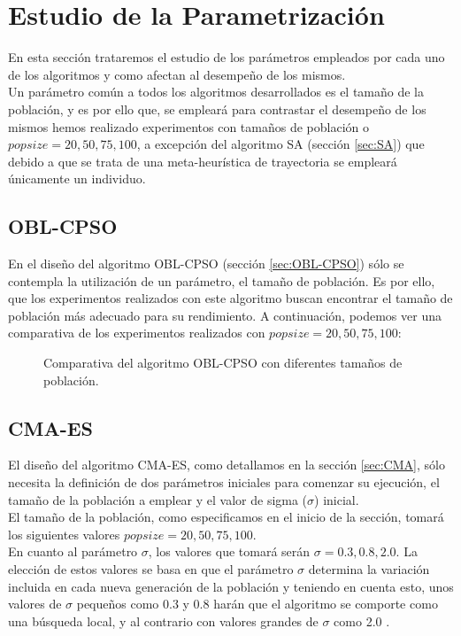 \newpage

\section{Estudio de la Parametrización}\label{sec:PARAM}

En esta sección trataremos el estudio de los parámetros empleados por cada uno de los algoritmos y como afectan al desempeño de los mismos. \\

Un parámetro común a todos los algoritmos desarrollados es el tamaño de la población, y es por ello que, se empleará para contrastar el desempeño de los mismos hemos realizado experimentos con tamaños de población o $popsize = 20, 50, 75, 100$, a excepción del algoritmo SA (sección \ref{sec:SA}) que debido a que se trata de una meta-heurística de trayectoria se empleará únicamente un individuo.

\subsection{OBL-CPSO}\label{sec:paramOBL_CPSO}

En el diseño del algoritmo OBL-CPSO (sección \ref{sec:OBL-CPSO}) sólo se contempla la utilización de un parámetro, el tamaño de población. Es por ello, que los experimentos realizados con este algoritmo buscan encontrar el tamaño de población más adecuado para su rendimiento. A continuación, podemos ver una comparativa de los experimentos realizados con $popsize = 20, 50, 75, 100$: \\

\begin{figure}[!ht]
  \centering
	\captionsetup{justification=centering}
  \caption{Comparativa del algoritmo OBL-CPSO con diferentes tamaños de población.}
\end{figure}

\subsection{CMA-ES}\label{sec:paramCMA_ES}

El diseño del algoritmo CMA-ES, como detallamos en la sección \ref{sec:CMA}, sólo necesita la definición de dos parámetros iniciales para comenzar su ejecución, el tamaño de la población a emplear y el valor de sigma ($\sigma$) inicial. \\
El tamaño de la población, como especificamos en el inicio de la sección, tomará los siguientes valores $popsize = 20, 50, 75, 100$. \\
En cuanto al parámetro $\sigma$, los valores que tomará serán $\sigma = 0.3, 0.8, 2.0$. La elección de estos valores se basa en que el parámetro $\sigma$ determina la variación incluida en cada nueva generación de la población y teniendo en cuenta esto, unos valores de $\sigma$ pequeños como 0.3 y 0.8 harán que el algoritmo se comporte como una búsqueda local, y al contrario con valores grandes de $\sigma$ como 2.0 \cite{CMA1}. \\


